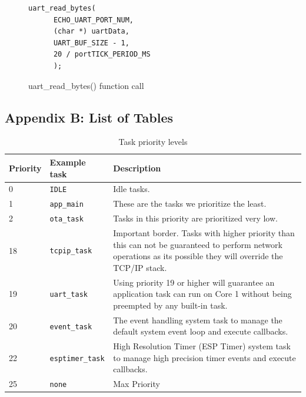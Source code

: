 \begin{figure}[h!]
  \centering
  \begin{lstlisting}[style=CStyle]
    uart_read_bytes(
      ECHO_UART_PORT_NUM, 
      (char *) uartData, 
      UART_BUF_SIZE - 1, 
      20 / portTICK_PERIOD_MS 
      );
  \end{lstlisting}
  \caption{uart\_read\_bytes() function call}
  \label{fig:uart_read_bytes_function}
\end{figure}

\clearpage

\subsection{Appendix B: List of Tables}
\label{sec:appendixB}

\begin{table}[h!]
  \centering
  \caption{Task priority levels}
  \label{table:task-priorities}
  \begin{tabularx}{\textwidth}{p{1cm}Xp{10cm}}
    \hline
    \textbf{Priority} & \textbf{Example task} & \textbf{Description} \\ 
    \hline
    0 & \texttt{IDLE} & Idle tasks. \\
    \hline
    1 & \texttt{app\_main} & These are the tasks we prioritize the least.\\
    \hline
    2 & \texttt{ota\_task} & Tasks in this priority are prioritized very low.\\
    \hline
    18 & \texttt{tcpip\_task} & Important border. Tasks with higher priority than this can not be guaranteed to perform network operations as its possible they will override the TCP/IP stack. \\
    \hline
    19 & \texttt{uart\_task} & Using priority 19 or higher will guarantee an application task can run on Core 1 without being preempted by any built-in task\cite{espressif:esp-idf-programming-guide}. \\
    \hline
    20 & \texttt{event\_task} & The event handling system task to manage the default system event loop and execute callbacks. \\
    \hline
    22 & \texttt{esptimer\_task} & High Resolution Timer (ESP Timer) system task to manage high precision timer events and execute callbacks. \\
    \hline
    25 & \texttt{none} & Max Priority \\
    \hline
  \end{tabularx}
\end{table}
